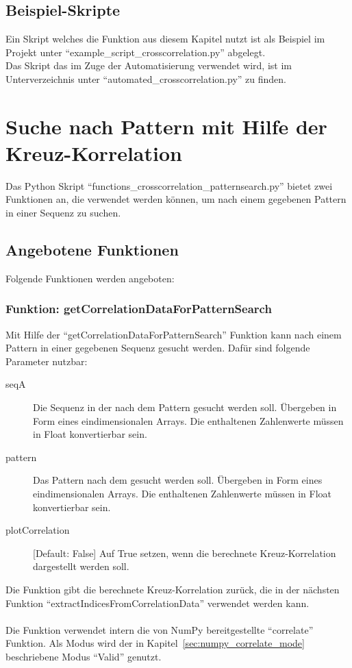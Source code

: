 \section{Beispiel-Skripte}
Ein Skript welches die Funktion aus diesem Kapitel nutzt ist als Beispiel im Projekt unter \enquote{example\_script\_crosscorrelation.py} abgelegt.\\
Das Skript das im Zuge der Automatisierung verwendet wird, ist im Unterverzeichnis  unter \enquote{automated\_crosscorrelation.py} zu finden.









\chapter{Suche nach Pattern mit Hilfe der Kreuz-Korrelation}
Das Python Skript \enquote{functions\_crosscorrelation\_patternsearch.py} bietet zwei Funktionen an, die verwendet werden können, 
um nach einem gegebenen Pattern in einer Sequenz zu suchen.

\section{Angebotene Funktionen}
Folgende Funktionen werden angeboten:

\subsection{Funktion: getCorrelationDataForPatternSearch}
Mit Hilfe der \enquote{getCorrelationDataForPatternSearch} Funktion kann nach einem Pattern in einer gegebenen Sequenz gesucht werden. Dafür sind folgende Parameter nutzbar:
\begin{description}
    \item[seqA] Die Sequenz in der nach dem Pattern gesucht werden soll. Übergeben in Form eines eindimensionalen Arrays. Die enthaltenen Zahlenwerte müssen in Float konvertierbar sein.
    \item[pattern] Das Pattern nach dem gesucht werden soll. Übergeben in Form eines eindimensionalen Arrays. Die enthaltenen Zahlenwerte müssen in Float konvertierbar sein.
    \item[plotCorrelation] [Default: False] Auf True setzen, wenn die berechnete Kreuz-Korrelation dargestellt werden soll.
\end{description}
Die Funktion gibt die berechnete Kreuz-Korrelation zurück, die in der nächsten Funktion \enquote{extractIndicesFromCorrelationData} verwendet werden kann.
\\
\\
Die Funktion verwendet intern die von NumPy bereitgestellte \enquote{correlate} Funktion. Als Modus wird der in Kapitel~\ref{sec:numpy_correlate_mode} beschriebene Modus \enquote{Valid} genutzt.

